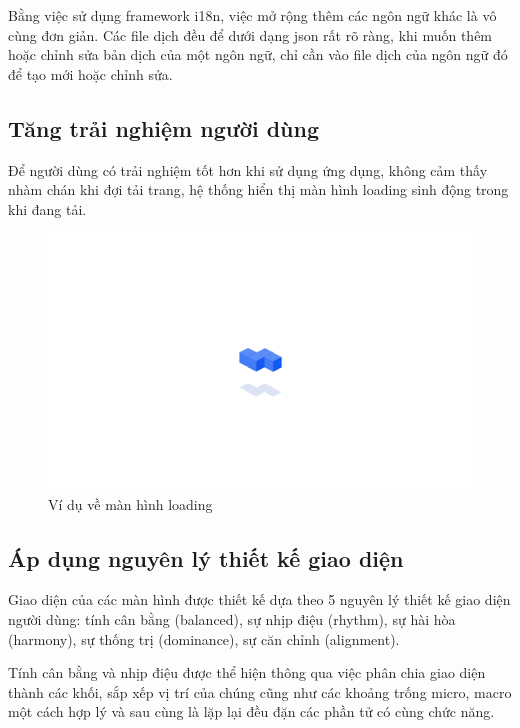 \documentclass[./../main.tex]{subfiles}
\begin{document}
Bằng việc sử dụng framework i18n, việc mở rộng thêm các ngôn ngữ khác là vô cùng đơn giản. Các file dịch đều để dưới dạng json rất rõ ràng, khi muốn thêm hoặc chỉnh sửa bản dịch của một ngôn ngữ, chỉ cần vào file dịch của ngôn ngữ đó để tạo mới hoặc chỉnh sửa.

\subsection{Tăng trải nghiệm người dùng}

Để người dùng có trải nghiệm tốt hơn khi sử dụng ứng dụng, không cảm thấy nhàm chán khi đợi tải trang, hệ thống hiển thị màn hình loading sinh động trong khi đang tải.

\begin{figure}[H]
	\includegraphics[width=\linewidth]{./images/image32.png}
	\caption{Ví dụ về màn hình loading}
	\label{fig:example_loading}
\end{figure}

\subsection{Áp dụng nguyên lý thiết kế giao diện}

Giao diện của các màn hình được thiết kế dựa theo 5 nguyên lý thiết kế giao diện người dùng: tính cân bằng (balanced), sự nhịp điệu (rhythm), sự hài hòa (harmony), sự thống trị (dominance), sự căn chỉnh (alignment).

Tính cân bằng và nhịp điệu được thể hiện thông qua việc phân chia giao diện thành các khối, sắp xếp vị trí của chúng cũng như các khoảng trống micro, macro một cách hợp lý và sau cùng là lặp lại đều đặn các phần tử có cùng chức năng.
\end{document}
